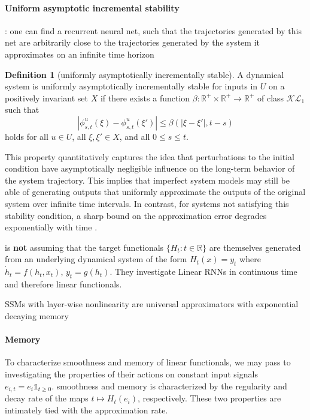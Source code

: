 \documentclass{article}
\theoremstyle{definition}
\newtheorem{definition}{Definition}
\theoremstyle{remark}
\begin{document}
\paragraph{Uniform asymptotic incremental stability}
\citep{pavlov2006uniform}
\citep{hanson2020universal}: one can find a recurrent neural net, such that the trajectories generated by this net are arbitrarily close to the trajectories generated by the system it approximates on an infinite time horizon

\begin{definition}[uniformly asymptotically incrementally stable]
A dynamical system is uniformly asymptotically incrementally stable for inputs in $U$ on a positively invariant set $X$ if there exists a function $\beta : \mathbb{R}^+ \times \mathbb{R}^+ \to \mathbb{R}^+$ of class $\mathcal{KL}_1$ such that 
\[
|\phi^u_{s,t}(\xi) - \phi^u_{s,t}(\xi')| \leq \beta(|\xi - \xi'|, t - s)
\]
holds for all $u \in U$, all $\xi, \xi' \in X$, and all $0 \leq s \leq t$.

\end{definition}
This property quantitatively captures the idea that perturbations to the initial condition have asymptotically negligible influence on the long-term behavior of the system trajectory.
This implies that imperfect system models may still be able of generating outputs that uniformly approximate the outputs of the original system over infinite time intervals.
In contrast, for systems not satisfying this stability condition, a sharp bound on the approximation error degrades exponentially with time \citep{hirsch1974nonautonomous, sontag2013mathematical}.

\citet{li2020curse} is \textbf{not} assuming that the target functionals \(\{H_t : t \in \mathbb{R}\}\) are themselves generated from an underlying dynamical system of the form \(H_t(x) = y_t\) where \(\dot{h}_t = f(h_t, x_t)\), \(y_t = g(h_t)\).
They investigate Linear RNNs in continuous time and therefore linear functionals.

SSMs with layer-wise nonlinearity are universal approximators with exponential decaying memory \citep{wang2024state}



\paragraph{Memory}
To characterize smoothness and memory of linear functionals, we may pass to investigating the properties of their actions on constant input signals $e_{i,t} = e_i \mathds{1}_{t\geq 0}$.
smoothness and memory is characterized by the regularity and decay rate of the maps $t\mapsto H_t(e_i)$, respectively.
These two properties are intimately tied with the approximation rate.
\end{document}
